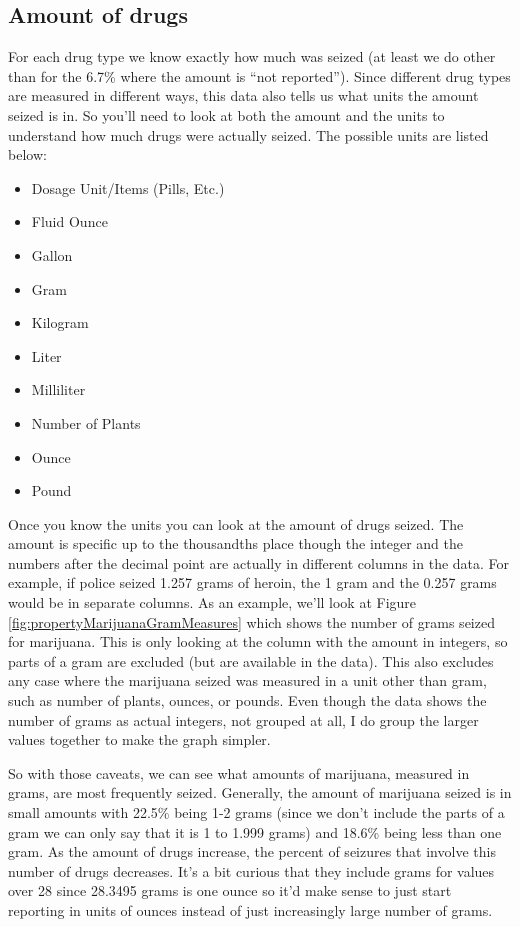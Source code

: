 \documentclass[
]{krantz}
\providecommand{\tightlist}{%
  \setlength{\itemsep}{0pt}\setlength{\parskip}{0pt}}
\begin{document}
\subsection{Amount of drugs}\label{amount-of-drugs}

For each drug type we know exactly how much was seized (at
least we do other than for the 6.7\% where the amount is
``not reported''). Since different drug types are measured
in different ways, this data also tells us what units the
amount seized is in. So you'll need to look at both the
amount and the units to understand how much drugs were
actually seized. The possible units are listed below:

\begin{itemize}
\tightlist
\item
  Dosage Unit/Items (Pills, Etc.)
\item
  Fluid Ounce
\item
  Gallon\\
\item
  Gram
\item
  Kilogram\\
\item
  Liter\\
\item
  Milliliter
\item
  Number of Plants\\
\item
  Ounce
\item
  Pound
\end{itemize}

Once you know the units you can look at the amount of drugs
seized. The amount is specific up to the thousandths place
though the integer and the numbers after the decimal point
are actually in different columns in the data. For example,
if police seized 1.257 grams of heroin, the 1 gram and the
0.257 grams would be in separate columns. As an example,
we'll look at Figure \ref{fig:propertyMarijuanaGramMeasures}
which shows the number of grams seized for marijuana. This
is only looking at the column with the amount in integers,
so parts of a gram are excluded (but are available in the
data). This also excludes any case where the marijuana
seized was measured in a unit other than gram, such as
number of plants, ounces, or pounds. Even though the data
shows the number of grams as actual integers, not grouped at
all, I do group the larger values together to make the graph
simpler.

So with those caveats, we can see what amounts of marijuana,
measured in grams, are most frequently seized. Generally,
the amount of marijuana seized is in small amounts with
22.5\% being 1-2 grams (since we don't include the parts of
a gram we can only say that it is 1 to 1.999 grams) and
18.6\% being less than one gram. As the amount of drugs
increase, the percent of seizures that involve this number
of drugs decreases. It's a bit curious that they include
grams for values over 28 since 28.3495 grams is one ounce so
it'd make sense to just start reporting in units of ounces
instead of just increasingly large number of grams.
\end{document}
